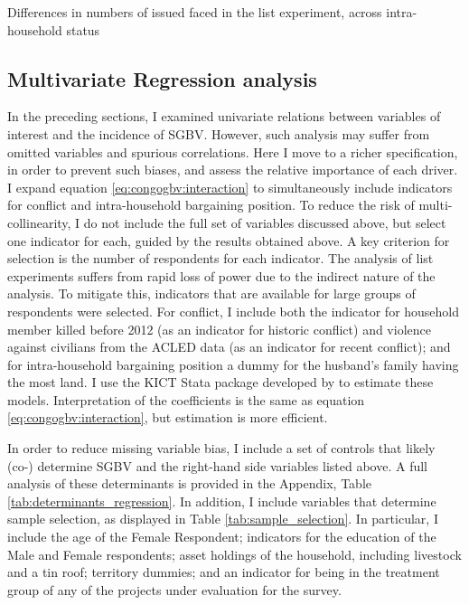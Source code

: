 \begin{table}[htb]
\caption{Differences in numbers of issued faced in the list experiment, across intra-household status}
\label{tab:meadifftab_mar}
\end{table}


\subsection{Multivariate Regression analysis}

In the preceding sections, I examined univariate relations between variables of interest and the incidence of SGBV. However, such analysis may suffer from omitted variables and spurious correlations. Here I move to a richer specification, in order to prevent such biases, and assess the relative importance of each driver. I expand equation \ref{eq:congogbv:interaction} to simultaneously include indicators for conflict and intra-household bargaining position. To reduce the risk of multi-collinearity, I do not include the full set of variables discussed above, but select one indicator for each, guided by the results obtained above. A key criterion for selection is the number of respondents for each indicator. The analysis of list experiments suffers from rapid loss of power due to the indirect nature of the analysis. To mitigate this, indicators that are available for large groups of respondents were selected. For conflict, I include both the indicator for household member killed before 2012 (as an indicator for historic conflict) and violence against civilians from the ACLED data (as an indicator for recent conflict); and for intra-household bargaining position a dummy for the husband's family having the most land. I use the KICT Stata package developed by \citet{Tsai2019} to estimate these models. Interpretation of the coefficients is the same as equation \ref{eq:congogbv:interaction}, but estimation is more efficient.

In order to reduce missing variable bias, I include a set of controls that likely (co-) determine SGBV and the right-hand side variables listed above. A full analysis of these determinants is provided in the Appendix, Table \ref{tab:determinants_regression}. In addition, I include variables that determine sample selection, as displayed in Table \ref{tab:sample_selection}. In particular, I include the age of the Female Respondent; indicators for the education of the Male and Female respondents; asset holdings of the household, including livestock and a tin roof; territory dummies; and an indicator for being in the treatment group of any of the projects under evaluation for the survey.

